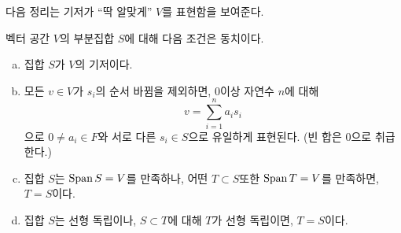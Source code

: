 다음 정리는 기저가 ``딱 알맞게'' $V$를 표현함을 보여준다.
\begin{theorem}
\label{thm:basischar}
    벡터 공간 $V$의 부분집합 $S$에 대해 다음 조건은 동치이다.
    \begin{enumerate}[(a)]
        \item 집합 $S$가 $V$의 기저이다. \label{item:basiscond}
        \item 모든 $v \in V$가 $s_i$의 순서 바뀜을 제외하면, $0$이상 자연수 $n$에 대해 
        \begin{equation*}
            v = \sum_{i = 1}^n a_i s_i
        \end{equation*}
        으로 $0 \neq a_i \in F$와 서로 다른 $s_i \in S$으로 유일하게 표현된다. (빈 합은 $0$으로 취급한다.) \label{item:uniquespan}
        \item 집합 $S$는 $\operatorname{Span} S = V$를 만족하나, 어떤 $T \subset S$또한 $\operatorname{Span} T = V$를 만족하면, $T = S$이다. \label{item:minspan}
        \item 집합 $S$는 선형 독립이나, $S \subset T$에 대해 $T$가 선형 독립이면, $T = S$이다. \label{item:maxind}
    \end{enumerate}
\end{theorem}
